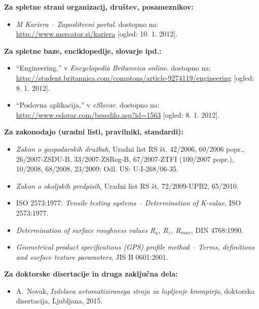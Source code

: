 \textbf{Za spletne strani organizacij, društev, posameznikov:}
\begin{itemize}
	\item[{[13]}] \emph{M Kariera – Zaposlitveni portal}. dostopno na:
	\url{http://www.mercator.si/kariera} [ogled: 10. 1. 2012].
\end{itemize}

\textbf{Za spletne baze, enciklopedije, slovarje ipd.:}
\begin{itemize}
	\item[{[14]}] ``Engineering,'' v \emph{Encyclopedia Britannica online}. 
	dostopno na:
	\url{http://student.britannica.com/comptons/article-9274119/engineering}
	[ogled: 8. 1. 2012].\\
	
	\item[{[15]}] ``Poslovna aplikacija,'' v \emph{eSlovar}. dostopno na:
	\url{http://www.eslovar.com/besedilo.asp?id=1563} [ogled: 8. 1. 2012].
\end{itemize}

\textbf{Za zakonodajo (uradni listi, pravilniki, standardi):}
\begin{itemize}
	\item[{[16]}] \emph{Zakon o gospodarskih družbah}, {U}radni list RS št. 
	42/2006, 60/2006 popr., 26/2007-ZSDU-B, 33/2007-ZSReg-B, 67/2007-ZTFI 
	(100/2007 
	popr.), 10/2008, 68/2008, 23/2009; Odl. US: U-I-268/06-35.\\
	
	\item[{[17]}] \emph{Zakon o okoljskih predpisih}, {U}radni list RS št. 
	72/2009-UPB2, 65/2010.\\
	
	\item[{[18]}] {ISO 2573:1977}: \emph{Tensile testing systems – 
	Determination of 
		K-value}, {ISO 2573:1977}.\\
	
	\item[{[19]}] \emph{Determination of surface roughness values R$_a$, R$_z$, 
		R$_{max}$}, {DIN 4768:1990}.\\
	
	\item[{[20]}] \emph{Geometrical product specifications (GPS) profile method 
	– 
		Terms, definitions and surface texture parameters}, {JIS B 0601:2001}.
\end{itemize}

\textbf{Za doktorske disertacije in druga zaključna dela:}
\begin{itemize}
	\item[{[21]}] A.~Novak, \emph{Izdelava avtomatiziranega stroja za lupljenje 
		krompirja}, doktorska disertacija, Ljubljana, 2015.
\end{itemize}

